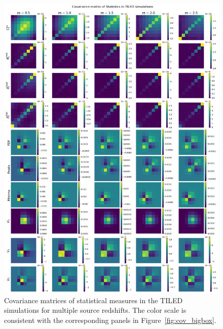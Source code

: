 \begin{figure}[p]
    \centering
    \includegraphics[width=\textwidth]{figures/results/cov_tiled.png}
    \caption[Covariance Matrices of Statistical Measures in TILED Simulations]{Covariance matrices of statistical measures in the TILED simulations for multiple source redshifts. The color scale is consistent with the corresponding panels in Figure~\ref{fig:cov_bigbox}.}
    \label{fig:cov_tiled}
\end{figure}

